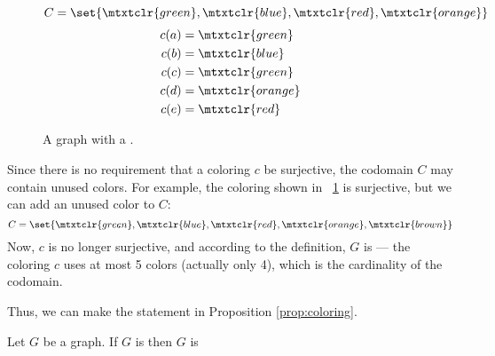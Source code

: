 \begin{figure}[H]
  \begin{minipage}{2.75in}
    \centering
  \end{minipage}
  \begin{minipage}{2.75in}
    \centering
    \(C=\set{\mtxtclr{green},\mtxtclr{blue},\mtxtclr{red},\mtxtclr{orange}}\)
    \begin{align*}
      c(a) &= \mtxtclr{green} \\
      c(b) &= \mtxtclr{blue} \\
      c(c) &= \mtxtclr{green} \\
      c(d) &= \mtxtclr{orange} \\
      c(e) &= \mtxtclr{red}
    \end{align*}
  \end{minipage}
  \caption{A graph with a .}
  \label{fig:exproper}
\end{figure}

Since there is no requirement that a coloring \(c\) be surjective, the codomain \(C\) may contain unused colors.
For example, the coloring shown in \figurename~\ref{fig:exproper} is surjective, but we can add an unused color to
\(C\):
\[C=\set{\mtxtclr{green},\mtxtclr{blue},\mtxtclr{red},\mtxtclr{orange},\mtxtclr{brown}}\]
Now, \(c\) is no longer surjective, and according to the definition, \(G\) is  --- the coloring \(c\)
uses at most 5 colors (actually only 4), which is the cardinality of the codomain.

Thus, we can make the statement in Proposition \ref{prop:coloring}.

\begin{proposition}
  \label{prop:coloring}
  Let \(G\) be a graph.  If \(G\) is  then \(G\) is 
\end{proposition}

